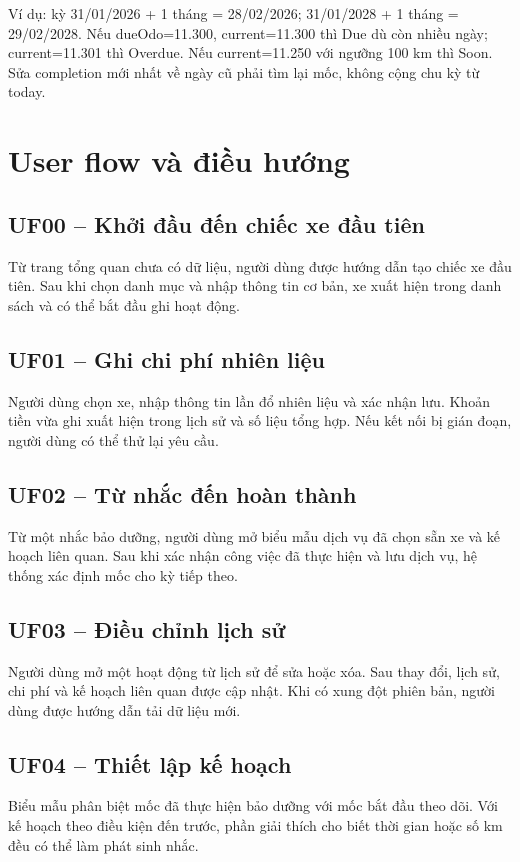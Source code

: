 Ví dụ: kỳ 31/01/2026 + 1 tháng = 28/02/2026; 31/01/2028 + 1 tháng = 29/02/2028. Nếu dueOdo=11.300, current=11.300 thì Due dù còn nhiều ngày; current=11.301 thì Overdue. Nếu current=11.250 với ngưỡng 100 km thì Soon. Sửa completion mới nhất về ngày cũ phải tìm lại mốc, không cộng chu kỳ từ today.

\section{User flow và điều hướng}
\subsection{UF00 -- Khởi đầu đến chiếc xe đầu tiên}
Từ trang tổng quan chưa có dữ liệu, người dùng được hướng dẫn tạo chiếc xe đầu tiên. Sau khi chọn danh mục và nhập thông tin cơ bản, xe xuất hiện trong danh sách và có thể bắt đầu ghi hoạt động.

\subsection{UF01 -- Ghi chi phí nhiên liệu}
Người dùng chọn xe, nhập thông tin lần đổ nhiên liệu và xác nhận lưu. Khoản tiền vừa ghi xuất hiện trong lịch sử và số liệu tổng hợp. Nếu kết nối bị gián đoạn, người dùng có thể thử lại yêu cầu.

\subsection{UF02 -- Từ nhắc đến hoàn thành}
Từ một nhắc bảo dưỡng, người dùng mở biểu mẫu dịch vụ đã chọn sẵn xe và kế hoạch liên quan. Sau khi xác nhận công việc đã thực hiện và lưu dịch vụ, hệ thống xác định mốc cho kỳ tiếp theo.

\subsection{UF03 -- Điều chỉnh lịch sử}
Người dùng mở một hoạt động từ lịch sử để sửa hoặc xóa. Sau thay đổi, lịch sử, chi phí và kế hoạch liên quan được cập nhật. Khi có xung đột phiên bản, người dùng được hướng dẫn tải dữ liệu mới.

\subsection{UF04 -- Thiết lập kế hoạch}
Biểu mẫu phân biệt mốc đã thực hiện bảo dưỡng với mốc bắt đầu theo dõi. Với kế hoạch theo điều kiện đến trước, phần giải thích cho biết thời gian hoặc số km đều có thể làm phát sinh nhắc.

